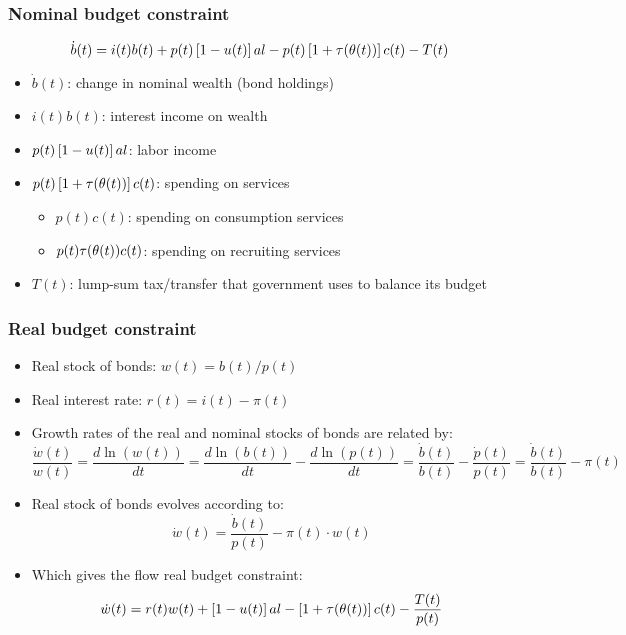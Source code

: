 \documentclass[11pt,aspectratio=169,xcolor={dvipsnames},hyperref={pdftex,pdfpagemode=UseNone,hidelinks,pdfdisplaydoctitle=true},usepdftitle=false]{beamer}
\begin{document}
\begin{frame}
\frametitle{Nominal budget constraint}
\vspace*{-7mm}\begin{equation*}
\dot{b}(t)= i(t) b(t) + p(t) \left[ 1-u(t) \right] al  - p(t) \left[ 1+\tau(\theta(t)) \right]  c(t) - T(t)
\end{equation*}\vspace*{-7mm}
\begin{itemize}
\item $\dot{b}(t)$: change in nominal wealth (bond holdings)
\item $i(t) b(t)$: interest income on wealth
\item $p(t) \left[ 1-u(t) \right] al$: labor income
\item $p(t) \left[ 1+\tau(\theta(t)) \right]  c(t)$: spending on services
\begin{itemize}
\item $p(t)c(t)$: spending on consumption services
\item $p(t)\tau(\theta(t)) c(t)$: spending on recruiting services
\end{itemize}
\item $T(t)$: lump-sum tax/transfer that government uses to balance its budget
\end{itemize}	
\end{frame}

\begin{frame}
\frametitle{Real budget constraint}
\begin{itemize}
\item Real stock of bonds: $w(t) = b(t)/p(t)$
\item Real interest rate: $r(t) = i(t)-\pi(t)$
\item Growth rates of the real and nominal stocks of bonds are related by:
\vspace*{-2mm}\begin{equation*}
\frac{\dot{w}(t)}{w(t)}=\frac{d\ln(w(t))}{dt}=\frac{d\ln(b(t))}{dt}-\frac{d\ln(p(t))}{dt} =\frac{\dot{b}(t)}{b(t)} - \frac{\dot{p}(t)}{p(t)} = \frac{\dot{b}(t)}{b(t)} - \pi(t)
\end{equation*}
\item Real stock of bonds evolves according to:
\vspace*{-2mm}\begin{equation*}
\dot{w}(t)=\frac{\dot{b}(t)}{p(t)} - \pi(t) \cdot w(t)
\end{equation*}
\item Which gives the flow real budget constraint:
\begin{equation*}
\dot{w}(t)= r(t) w(t) + \left[ 1-u(t) \right] a l  - \left[ 1+\tau(\theta(t)) \right]  c(t) - \frac{T(t)}{p(t)}
\end{equation*}
\end{itemize}	
\end{frame}
\end{document}
